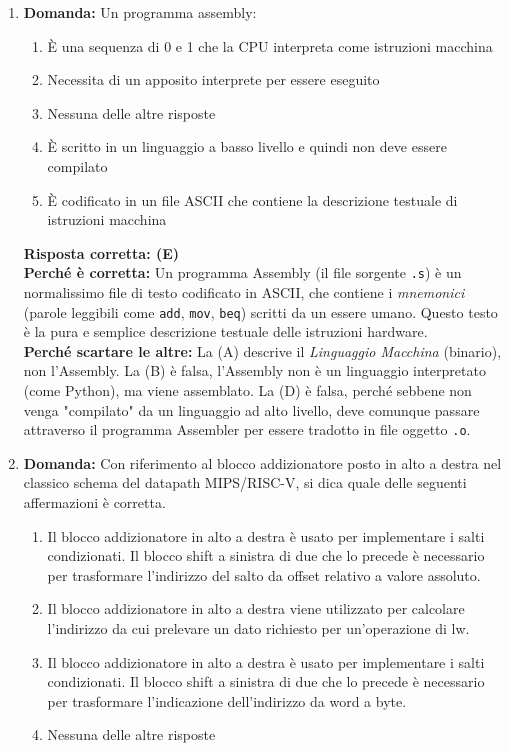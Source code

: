 \documentclass[12pt, a4paper]{article}
\begin{document}
\begin{enumerate}
    \item \textbf{Domanda:} Un programma assembly:
    \begin{enumerate}[label=(\Alph*)]
        \item È una sequenza di 0 e 1 che la CPU interpreta come istruzioni macchina
        \item Necessita di un apposito interprete per essere eseguito
        \item Nessuna delle altre risposte
        \item È scritto in un linguaggio a basso livello e quindi non deve essere compilato
        \item È codificato in un file ASCII che contiene la descrizione testuale di istruzioni macchina
    \end{enumerate}
    \textbf{Risposta corretta: (E)} \\
    \textbf{Perché è corretta:} Un programma Assembly (il file sorgente \texttt{.s}) è un normalissimo file di testo codificato in ASCII, che contiene i \textit{mnemonici} (parole leggibili come \texttt{add}, \texttt{mov}, \texttt{beq}) scritti da un essere umano. Questo testo è la pura e semplice descrizione testuale delle istruzioni hardware. \\
    \textbf{Perché scartare le altre:} La (A) descrive il \textit{Linguaggio Macchina} (binario), non l'Assembly. La (B) è falsa, l'Assembly non è un linguaggio interpretato (come Python), ma viene assemblato. La (D) è falsa, perché sebbene non venga "compilato" da un linguaggio ad alto livello, deve comunque passare attraverso il programma Assembler per essere tradotto in file oggetto \texttt{.o}.


    \item \textbf{Domanda:} Con riferimento al blocco addizionatore posto in alto a destra nel classico schema del datapath MIPS/RISC-V, si dica quale delle seguenti affermazioni è corretta.
    \begin{enumerate}[label=(\Alph*)]
        \item Il blocco addizionatore in alto a destra è usato per implementare i salti condizionati. Il blocco shift a sinistra di due che lo precede è necessario per trasformare l'indirizzo del salto da offset relativo a valore assoluto.
        \item Il blocco addizionatore in alto a destra viene utilizzato per calcolare l'indirizzo da cui prelevare un dato richiesto per un'operazione di lw.
        \item Il blocco addizionatore in alto a destra è usato per implementare i salti condizionati. Il blocco shift a sinistra di due che lo precede è necessario per trasformare l'indicazione dell'indirizzo da word a byte.
        \item Nessuna delle altre risposte
    \end{enumerate}


\end{enumerate}
\end{document}
